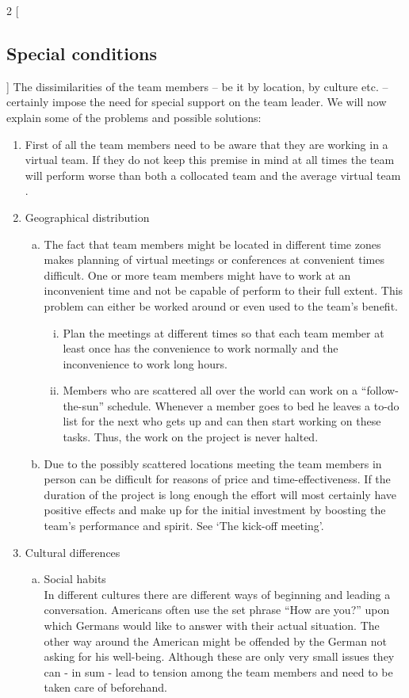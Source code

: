 \begin{multicols}{2}
[\subsection{Special conditions }]
The dissimilarities of the team members – be it by location, by culture etc. – certainly impose the need for special support on the team leader.
We will now explain some of the problems and possible solutions:
\begin{enumerate}[1.]
\item First of all the team members need to be aware that they are working in a virtual team. If they do not keep this premise in mind at all times the team will perform worse than both a collocated team and the average virtual team \cite{outperform}.
\item Geographical distribution
		\begin{enumerate}[a)]
		  \item The fact that team members might be located in different time zones makes planning of virtual meetings or conferences at convenient times difficult. One or more team members might have to work at an inconvenient time and not be capable of perform to their full extent. This problem can either be worked around or even used to the team’s benefit.
			\begin{enumerate}[i.]
			  	\item Plan the meetings at different times so that each team member at least once has the convenience to work normally and the inconvenience to work long hours.
				\item Members who are scattered all over the world can work on a “follow-the-sun” schedule. Whenever a member goes to bed he leaves a to-do list for the next who gets up and can then start working on these tasks. Thus, the work on the project is never halted.
			\end{enumerate}
		  \item Due to the possibly scattered locations meeting the team members in person can be difficult for reasons of price and time-effectiveness. If the duration of the project is long enough the effort will most certainly have positive effects and make up for the initial investment by boosting the team’s performance and spirit. See ‘The kick-off meeting’.
		\end{enumerate}
\item Cultural differences
		\begin{enumerate}[a)]
		  \item Social habits \\ In different cultures there are different ways of beginning and leading a conversation. Americans often use the set phrase “How are you?” upon which Germans would like to answer with their actual situation. The other way around the American might be offended by the German not asking for his well-being. Although these are only very small issues they can - in sum - lead to tension among the team members and need to be taken care of beforehand.

\end{enumerate}
\end{enumerate}
\end{multicols}

